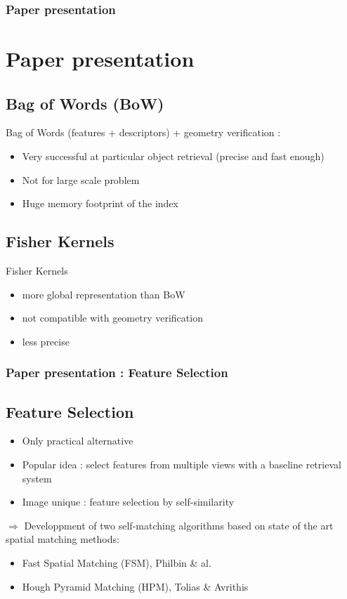 \documentclass[11pt]{beamer}
\begin{document}
\begin{frame}
\frametitle{Paper presentation}
\section{Paper presentation}

\subsection{Bag of Words (BoW)}
Bag of Words (features + descriptors) + geometry verification :
\begin{itemize}
\item Very successful at particular object retrieval (precise and fast enough)
\item Not for large scale problem
\item Huge memory footprint of the index
\end{itemize}
\vspace{0.3cm}
\subsection{Fisher Kernels}
Fisher Kernels
\begin{itemize}
\item more global representation than BoW
\item not compatible with geometry verification
\item less precise
\end{itemize}

\end{frame}

\begin{frame}
\frametitle{Paper presentation : Feature Selection}
\subsection{Feature Selection}
\begin{itemize}
\item Only practical alternative
\item Popular idea : select features from multiple views with a baseline retrieval system
\item Image unique : feature selection by self-similarity
\end{itemize}

$\Rightarrow$ Developpment of two self-matching algorithms based on state of the art spatial matching methods:
\begin{itemize}
\item Fast Spatial Matching (FSM), Philbin \& al.
\item Hough Pyramid Matching (HPM), Tolias \& Avrithis
\end{itemize}

\end{frame}
\end{document}
